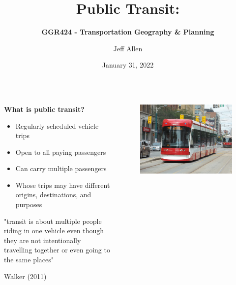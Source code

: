 \documentclass[aspectratio=169]{beamer}
\title{\textbf{Public Transit:}}
\subtitle{\textbf{GGR424 - Transportation Geography \& Planning}}
\author{Jeff Allen}
\institute{University of Toronto}
\date{January 31, 2022}
\begin{document}
	
\begin{frame}
	\titlepage	
\end{frame}

%
%	
%		
%		
%		




\begin{frame}
	\begin{columns}
		\begin{column}{0.5\textwidth}
			
			\textbf{What is public transit?}
			
			\small
			
			\begin{itemize}
				\item Regularly scheduled vehicle trips
				\item Open to all paying passengers
				\item Can carry multiple passengers
				\item Whose trips may have different origins, destinations, and purposes
			\end{itemize}
		
			\vspace{2mm}
		
			"transit is about multiple people riding in one vehicle even though they are not intentionally travelling together or even going to the same places"
			
			\vspace{2mm}
			
			Walker (2011)
			
		\end{column}
		
		\begin{column}{0.5\textwidth}
			\begin{figure}
				\centering
				\includegraphics[width=1\linewidth]{images/spadina_streetcar.jpg}
			\end{figure}
			

\end{column}
\end{columns}
\end{frame}
\end{document}
